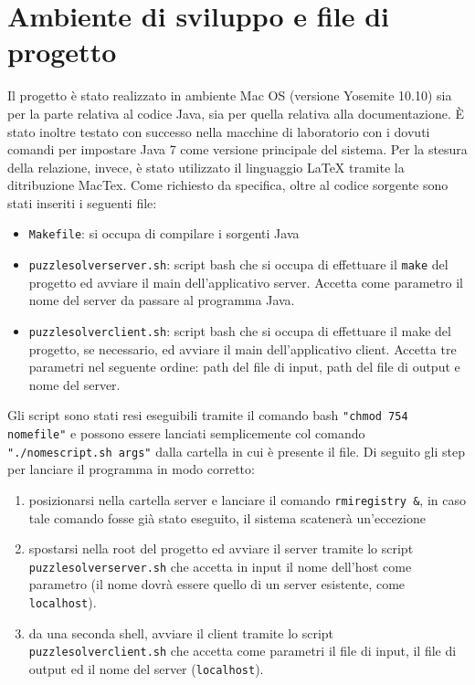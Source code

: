 %
%

\section{Ambiente di sviluppo e file di progetto}
Il progetto \`{e} stato realizzato in ambiente Mac OS (versione Yosemite 10.10) sia per la parte relativa al codice Java,
sia per quella relativa alla documentazione.
\`{E} stato inoltre testato con successo nella macchine di laboratorio con i dovuti comandi per impostare Java 7 come
versione principale del sistema.
Per la stesura della relazione, invece, \`{e} stato utilizzato il linguaggio \LaTeX{}  tramite la ditribuzione MacTex.
Come richiesto da specifica, oltre al codice sorgente sono stati inseriti i seguenti file:
\begin{itemize}
    \item \texttt{Makefile}: si occupa di compilare i sorgenti Java
    \item \texttt{puzzlesolverserver.sh}: script bash che si occupa di effettuare il \texttt{make} del progetto
    ed avviare il main dell'applicativo server. Accetta come parametro il nome del server da passare al programma Java.
    \item \texttt{puzzlesolverclient.sh}: script bash che si occupa di effettuare il make del progetto, se necessario,
    ed avviare il main dell'applicativo client. Accetta tre parametri nel seguente ordine: path del file di input, path
    del file di output e nome del server.
\end{itemize}
Gli script sono stati resi eseguibili tramite il comando bash \texttt{"chmod 754 nomefile"} e possono essere lanciati
semplicemente col comando \texttt{"./nomescript.sh args"} dalla cartella in cui è presente il file.
Di seguito gli step per lanciare il programma in modo corretto:
\begin{enumerate}
    \item posizionarsi nella cartella server e lanciare il comando \texttt{rmiregistry \&}, in caso tale comando fosse
    già stato eseguito, il sistema scatenerà un'eccezione
    \item spostarsi nella root del progetto ed avviare il server tramite lo script \newline \texttt{puzzlesolverserver.sh} che
    accetta in input il nome dell'host come parametro (il nome dovrà essere quello di un server esistente, come \texttt{localhost}).
    \item da una seconda shell, avviare il client tramite lo script \texttt{puzzlesolverclient.sh} che accetta come parametri
    il file di input, il file di output ed il nome del server (\texttt{localhost}).
\end{enumerate}
\clearpage
